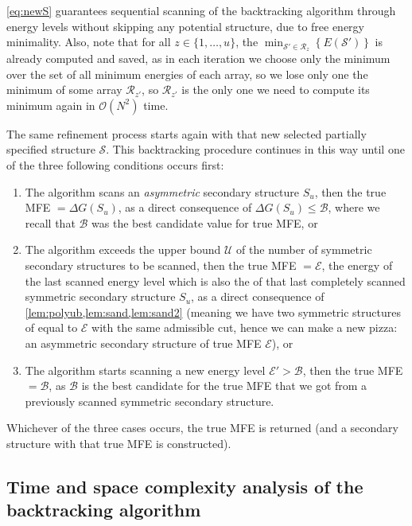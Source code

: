 \begin{remark}\label{remark:newS}
	\cref{eq:newS} guarantees sequential scanning of the backtracking algorithm through energy levels without skipping any potential structure, due to free energy minimality. Also, note that for all $z \in \{1,\ldots,u\}$, the  $\min_{\mathcal{S}' \in \mathcal{R}_z}\left\{ E(\mathcal{S}')\right\}$ is already computed and saved, as in each iteration we choose only the minimum over the set of all minimum energies of each array, so we lose only one the minimum of some array $\mathcal{R}_{z'}$, so $\mathcal{R}_{z'}$ is the only one we need to compute its minimum again in $\mathcal{O}(N^2)$ time.        
\end{remark} 

The same refinement process starts again with that new selected partially specified structure $\mathcal{S}$. This backtracking procedure continues in this way until one of the three following conditions occurs first: 
\begin{enumerate}
	\item  The algorithm scans an {\em asymmetric} secondary structure $S_u$, then the true MFE $= \Delta G (S_u)$, as a direct consequence of $\Delta G (S_u) \leq \mathcal{B}$, where we recall that $\mathcal{B}$ was the best candidate value for true MFE, or 
	\item  The algorithm exceeds the upper bound $\mathcal{U}$ of the number of symmetric secondary structures to be scanned, then the true MFE $= \mathcal{E}$, the energy of the last scanned energy level which is also the \snMFE of that last completely scanned symmetric secondary structure $S_u$, as a direct consequence of \cref{lem:polyub,lem:sand,lem:sand2} (meaning we have two symmetric structures of  \snMFE equal to $\mathcal{E}$ with the same admissible cut, hence we can make a new pizza: an asymmetric secondary structure of true MFE $\mathcal{E}$), or
	\item  The algorithm starts scanning a new energy level $\mathcal{E}' > \mathcal{B}$, then the true MFE $= \mathcal{B}$, as $\mathcal{B}$ is the best candidate for the true MFE that we got from a previously scanned symmetric secondary structure.   
\end{enumerate}
Whichever of the three cases occurs, the true MFE is returned (and a secondary structure with that true MFE is constructed).

\subsection{Time and space complexity analysis of the backtracking algorithm}\label{sec:backtime}

